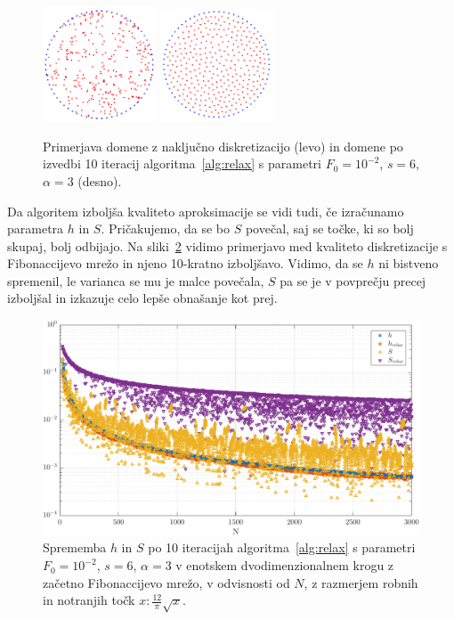 \documentclass[12pt,a4paper,twoside]{article}
\theoremstyle{definition} %
\theoremstyle{plain} %
\numberwithin{equation}{section}
\newlength{\iw}
\begin{document}
\begin{figure}[!ht]
  \centering
  \includegraphics[width=0.3\textwidth]{images/domain_circle.png}
  \hspace{1em}
  \includegraphics[width=0.3\textwidth]{images/domain_circle_relaxed.png}
  \caption{Primerjava domene z naključno diskretizacijo (levo) in domene po
  izvedbi 10 iteracij algoritma~\ref{alg:relax} s parametri $F_0 = 10^{-2}$, $s
  = 6$, $\alpha = 3$ (desno).}
  \label{fig:relax-circle}
\end{figure}

Da algoritem izboljša kvaliteto aproksimacije se vidi tudi, če izračunamo
parametra $h$ in $S$. Pričakujemo, da se bo $S$ povečal, saj se točke, ki so
bolj skupaj, bolj odbijajo. Na sliki~\ref{fig:relax-hs} vidimo primerjavo med
kvaliteto diskretizacije s Fibonaccijevo mrežo in njeno 10-kratno izboljšavo.
Vidimo, da se $h$ ni bistveno spremenil, le varianca se mu je malce povečala,
$S$ pa se je v povprečju precej izboljšal in izkazuje celo lepše obnašanje kot
prej.

\begin{figure}[ht]
  \centering
  \includegraphics[width=\iw]{images/relax_improvement.pdf}
  \caption{Sprememba $h$ in $S$ po 10 iteracijah algoritma~\ref{alg:relax} s
  parametri $F_0 = 10^{-2}$, $s = 6$, $\alpha = 3$ v enotskem dvodimenzionalnem
  krogu z začetno Fibonaccijevo mrežo, v odvisnosti od $N$, z razmerjem robnih in
  notranjih točk $x : \frac{12}{\pi} \sqrt{x}$.}
  \label{fig:relax-hs}
\end{figure}
\end{document}
